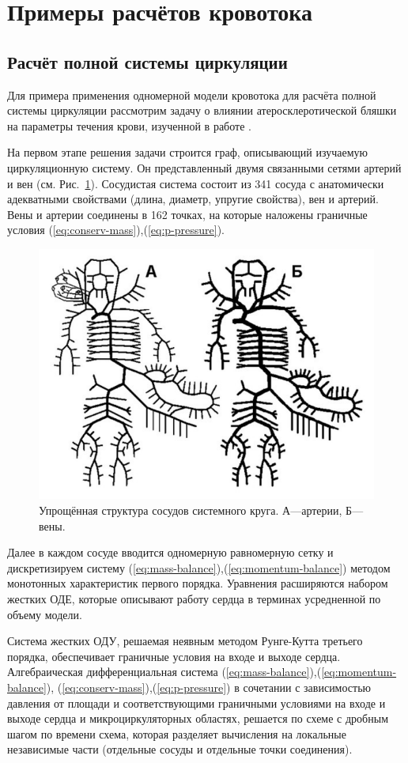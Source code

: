 \section{Примеры расчётов кровотока}
\subsection{Расчёт полной системы циркуляции}
Для примера применения одномерной модели кровотока для расчёта полной системы циркуляции рассмотрим
задачу о влиянии атеросклеротической бляшки на параметры течения крови, изученной в работе \cite{vassilevski:2011}.

На первом этапе решения задачи строится граф, описывающий изучаемую циркуляционную систему.
Он представленный двумя связанными сетями артерий и вен (см. Рис.~\ref{ss}). 
Сосудистая система состоит из 341 сосуда с анатомически адекватными свойствами (длина, диаметр, упругие свойства), вен и артерий. 
Вены и артерии соединены в 162 точках, на которые наложены граничные условия (\ref{eq:conserv-mass}),(\ref{eq:p-pressure}). 

\begin{figure}[h]
\centering
\includegraphics[width=0.5\linewidth]{krug.png}
\caption{Упрощённая структура сосудов системного круга. А—артерии, Б—вены.}
\label{ss}
\end{figure}

Далее в каждом сосуде вводится одномерную равномерную сетку и дискретизируем систему (\ref{eq:mass-balance}),(\ref{eq:momentum-balance}) 
методом монотонных характеристик первого порядка. Уравнения расширяются набором жестких ОДЕ, которые описывают работу сердца в терминах 
усредненной по объему модели.

Система жестких ОДУ, решаемая неявным методом Рунге-Кутта третьего порядка, обеспечивает граничные условия на входе и выходе сердца. 
Алгебраическая дифференциальная система (\ref{eq:mass-balance}),(\ref{eq:momentum-balance}), (\ref{eq:conserv-mass}),(\ref{eq:p-pressure}) 
в сочетании с зависимостью давления от площади и соответствующими граничными условиями на входе и выходе сердца 
и микроциркуляторных областях, решается по схеме с дробным шагом по времени схема, которая разделяет вычисления на 
локальные независимые части (отдельные сосуды и отдельные точки соединения).

